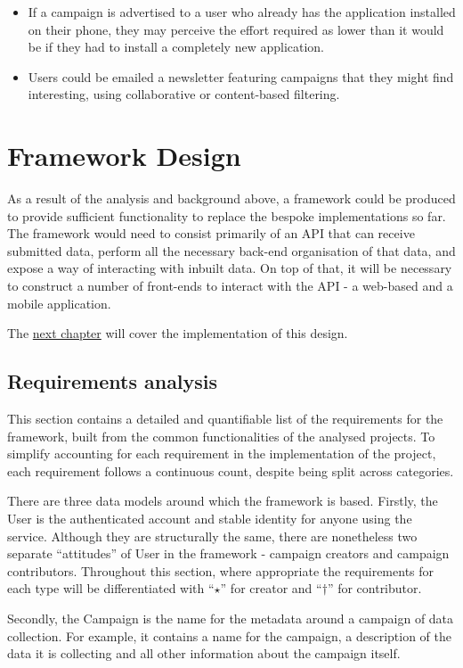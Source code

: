 \documentclass{article}
\newcommand\ssection{\clearpage\section}
\begin{document}
\begin{enumerate}
\begin{itemize}
				\item If a campaign is advertised to a user who already has the application installed on their phone, they may perceive the effort required as lower than it would be if they had to install a completely new application.
				\item Users could be emailed a newsletter featuring campaigns that they might find interesting, using collaborative or content-based filtering.
			\end{itemize}
		\end{enumerate}

	\ssection{Framework Design}
	\label{sec:architecture}
		As a result of the analysis and background above, a framework could be produced to provide sufficient functionality to replace the bespoke implementations so far. The framework would need to consist primarily of an API that can receive submitted data, perform all the necessary back-end organisation of that data, and expose a way of interacting with inbuilt data. On top of that, it will be necessary to construct a number of front-ends to interact with the API - a web-based and a mobile application.

		The \hyperref[sec:implementation]{next chapter} will cover the implementation of this design.

		\subsection{Requirements analysis}

		This section contains a detailed and quantifiable list of the requirements for the framework, built from the common functionalities of the analysed projects. To simplify accounting for each requirement in the implementation of the project, each requirement follows a continuous count, despite being split across categories.

		There are three data models around which the framework is based. Firstly, the User is the authenticated account and stable identity for anyone using the service. Although they are structurally the same, there are nonetheless two separate ``attitudes'' of User in the framework - campaign creators and campaign contributors. Throughout this section, where appropriate the requirements for each type will be differentiated with ``$\star$'' for creator and ``$\dagger$'' for contributor.

		Secondly, the Campaign is the name for the metadata around a campaign of data collection. For example, it contains a name for the campaign, a description of the data it is collecting and all other information about the campaign itself.
\end{document}
